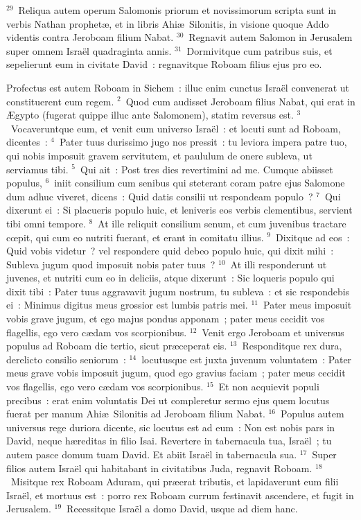 ${}^{29}$~Reliqua autem operum Salomonis priorum et novissimorum scripta sunt in verbis Nathan prophet\ae , et in libris Ahi\ae\ Silonitis, in visione quoque Addo videntis contra Jeroboam filium Nabat.
${}^{30}$~Regnavit autem Salomon in Jerusalem super omnem Isra\"el quadraginta annis.
${}^{31}$~Dormivitque cum patribus suis, et sepelierunt eum in civitate David~: regnavitque Roboam filius ejus pro eo.

\bchapter
\lettrine[lines=3,image=true,loversize=0.05,lraise=-0.03]{P}{}rofectus est autem Roboam in Sichem~: illuc enim cunctus Isra\"el convenerat ut constituerent eum regem.
${}^{2}$~Quod cum audisset Jeroboam filius Nabat, qui erat in \AE gypto (fugerat quippe illuc ante Salomonem), statim reversus est.
${}^{3}$~Vocaveruntque eum, et venit cum universo Isra\"el~: et locuti sunt ad Roboam, dicentes~:
${}^{4}$~Pater tuus durissimo jugo nos pressit~: tu leviora impera patre tuo, qui nobis imposuit gravem servitutem, et paululum de onere subleva, ut serviamus tibi.
${}^{5}$~Qui ait~: Post tres dies revertimini ad me. Cumque abiisset populus,
${}^{6}$~iniit consilium cum senibus qui steterant coram patre ejus Salomone dum adhuc viveret, dicens~: Quid datis consilii ut respondeam populo~?
${}^{7}$~Qui dixerunt ei~: Si placueris populo huic, et leniveris eos verbis clementibus, servient tibi omni tempore.
${}^{8}$~At ille reliquit consilium senum, et cum juvenibus tractare cœpit, qui cum eo nutriti fuerant, et erant in comitatu illius.
${}^{9}$~Dixitque ad eos~: Quid vobis videtur~? vel respondere quid debeo populo huic, qui dixit mihi~: Subleva jugum quod imposuit nobis pater tuus~?
${}^{10}$~At illi responderunt ut juvenes, et nutriti cum eo in deliciis, atque dixerunt~: Sic loqueris populo qui dixit tibi~: Pater tuus aggravavit jugum nostrum, tu subleva~: et sic respondebis ei~: Minimus digitus meus grossior est lumbis patris mei.
${}^{11}$~Pater meus imposuit vobis grave jugum, et ego majus pondus apponam~; pater meus cecidit vos flagellis, ego vero c\ae dam vos scorpionibus.
${}^{12}$~Venit ergo Jeroboam et universus populus ad Roboam die tertio, sicut pr\ae ceperat eis.
${}^{13}$~Responditque rex dura, derelicto consilio seniorum~:
${}^{14}$~locutusque est juxta juvenum voluntatem~: Pater meus grave vobis imposuit jugum, quod ego gravius faciam~; pater meus cecidit vos flagellis, ego vero c\ae dam vos scorpionibus.
${}^{15}$~Et non acquievit populi precibus~: erat enim voluntatis Dei ut compleretur sermo ejus quem locutus fuerat per manum Ahi\ae\ Silonitis ad Jeroboam filium Nabat.
${}^{16}$~Populus autem universus rege duriora dicente, sic locutus est ad eum~: Non est nobis pars in David, neque h\ae reditas in filio Isai. Revertere in tabernacula tua, Isra\"el~; tu autem pasce domum tuam David. Et abiit Isra\"el in tabernacula sua.
${}^{17}$~Super filios autem Isra\"el qui habitabant in civitatibus Juda, regnavit Roboam.
${}^{18}$~Misitque rex Roboam Aduram, qui pr\ae erat tributis, et lapidaverunt eum filii Isra\"el, et mortuus est~: porro rex Roboam currum festinavit ascendere, et fugit in Jerusalem.
${}^{19}$~Recessitque Isra\"el a domo David, usque ad diem hanc.


